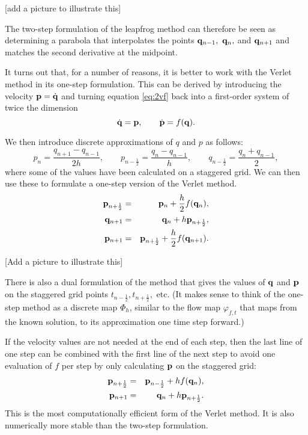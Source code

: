 [add a picture to illustrate this]

The two-step formulation of the leapfrog method can therefore be seen as determining a parabola that interpolates the points ${\bf q}_{n-1},~{\bf q}_{n},$ and ${\bf q}_{n+1}$ and matches the second derivative at the midpoint.

It turns out that, for a number of reasons, it is better to work with the Verlet method in its one-step formulation. This can be derived by introducing the velocity ${\bf p}=\dot{\bf q}$ and turning equation \ref{eq:2vf} back into a first-order system of twice the dimension
$$
	\dot{\bf q} = {\bf p},\qquad \dot{\bf p} = f({\bf q}).
$$

We then introduce discrete approximations of $q$ and $p$ as follows:
$$
p_n =\frac{q_{n+1}-q_{n-1}}{2h},\qquad p_{n-\frac12} = \frac{q_n-q_{n-1}}{h}, \qquad q_{n-\frac12} = \frac{q_n + q_{n-1}}{2},
$$
where some of the values have been calculated on a staggered grid. We can then use these to formulate a one-step version of the Verlet method. 
\begin{eqnarray*}
	{\bf p}_{n+\frac12} &=& {\bf p}_n+\frac{h}{2}f({\bf q}_n),\\
	{\bf q}_{n+1} &=& {\bf q}_n +h{\bf p}_{n+\frac12},\\
	{\bf p}_{n+1} &=& {\bf p}_{n+\frac12}+\frac{h}{2}f({\bf q}_{n+1}).
\end{eqnarray*}

[Add a picture to illustrate this]

There is also a dual formulation of the method that gives the values of ${\bf q}$ and ${\bf p}$ on the staggered grid points $t_{n-\frac12},t_{n+\frac12},$ etc.
(It makes sense to think of the one-step method as a discrete map $\Phi_h$, similar to the flow map $\varphi_{f,t}$ that maps from the known solution, to its approximation one time step forward.)

If the velocity values are not needed at the end of each step, then the last line of one step can be combined with the first line of the next step to avoid one evaluation of $f$ per step by only calculating ${\bf p}$ on the staggered grid:
\begin{eqnarray*}
	{\bf p}_{n+\frac12} &=& {\bf p}_{n-\frac12}+hf({\bf q}_n),\\
	{\bf p}_{n+1} &=& {\bf q}_n +h{\bf p}_{n+\frac12}.
\end{eqnarray*}
This is the most computationally efficient form of the Verlet method. It is also numerically more stable than the two-step formulation.

